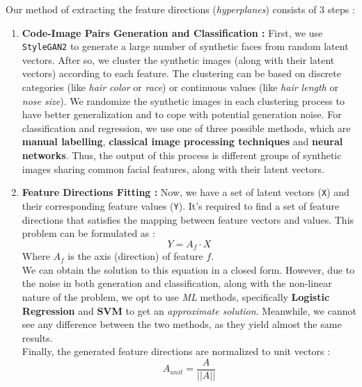 Our method of extracting the feature directions (\emph{hyperplanes}) consists of $3$ steps :
\begin{enumerate}
    \item \textbf{Code-Image Pairs Generation and Classification :} First, we use \texttt{StyleGAN2} to generate a large number of synthetic faces from random latent vectors. After so, we cluster the synthetic images (along with their latent vectors) according to each feature. The clustering can be based on discrete categories (like \emph{hair color} or \emph{race}) or continuous values (like \emph{hair length} or \emph{nose size}). We randomize the synthetic images in each clustering process to have better generalization and to cope with potential generation noise. For classification and regression, we use one of three possible methods, which are \textbf{manual labelling}, \textbf{classical image processing techniques} and \textbf{neural networks}. Thus, the output of this process is different groups of synthetic images sharing common facial features, along with their latent vectors.
    
    \item \textbf{Feature Directions Fitting :} Now, we have a set of latent vectors (\texttt{X}) and their corresponding feature values (\texttt{Y}). It's required to find a set of feature directions that satisfies the mapping between feature vectors and values. This problem can be formulated as :
    \begin{equation}
        Y = A_f \cdot X
    \end{equation}
    Where $A_f$ is the axis (direction) of feature $f$. \\
    We can obtain the solution to this equation in a closed form. However, due to the noise in both generation and classification, along with the non-linear nature of the problem, we opt to use \emph{ML} methods, specifically \textbf{Logistic Regression} and \textbf{SVM} to get an \emph{approximate solution}. Meanwhile, we cannot see any difference between the two methods, as they yield almost the same results. \\
    Finally, the generated feature directions are normalized to unit vectors :
    \begin{equation}
        A_{unit} = \frac{A}{||A||}
    \end{equation}
    

\end{enumerate}
